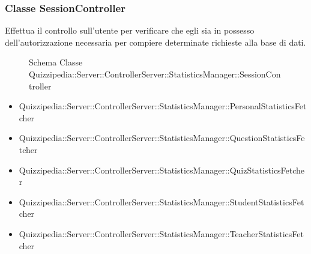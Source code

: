 \subsubsection{Classe SessionController}
Effettua il controllo sull'utente per verificare che egli sia in possesso dell'autorizzazione necessaria per compiere determinate richieste alla base di dati.
\begin{figure}[H]
\centering
\noindent{}
\caption[Schema Classe SessionController]{Schema Classe Quizzipedia::Server::ControllerServer::StatisticsManager::SessionController}
\end{figure}
\begin{itemize}
\item Quizzipedia::Server::ControllerServer::StatisticsManager::PersonalStatisticsFetcher
\item Quizzipedia::Server::ControllerServer::StatisticsManager::QuestionStatisticsFetcher
\item Quizzipedia::Server::ControllerServer::StatisticsManager::QuizStatisticsFetcher
\item Quizzipedia::Server::ControllerServer::StatisticsManager::StudentStatisticsFetcher
\item Quizzipedia::Server::ControllerServer::StatisticsManager::TeacherStatisticsFetcher
\end{itemize}
